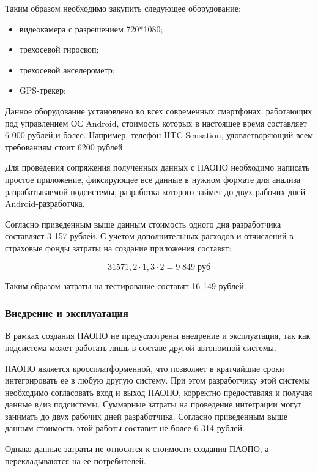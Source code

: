 Таким образом необходимо закупить следующее оборудование:
\begin{itemize}
\item видеокамера с разрешением 720*1080;
\item трехосевой гироскоп;
\item трехосевой акселерометр;
\item GPS-трекер;
\end{itemize}

Данное оборудование установлено во всех современных смартфонах, работающих под управлением ОС Android, стоимость которых в настоящее время составляет 6 000 рублей и более. Например, телефон HTC Sensation, удовлетворяющий всем требованиям стоит 6200 рублей. 

Для проведения сопряжения полученных данных с ПАОПО необходимо написать простое приложение, фиксирующее все данные в нужном формате для анализа разрабатываемой подсистемы, разработка которого займет до двух рабочих дней Android-разработчка. 

Согласно приведенным выше данным стоимость одного дня разработчика составляет 3 157 рублей. С учетом дополнительных расходов и отчислений в страховые фонды затраты на создание приложения составят:

$$31571,2 \cdot 1,3 \cdot 2=9 \; 849 \; руб$$

Таким образом затраты на тестирование составят 16 149 рублей.

\subsubsection{Внедрение и эксплуатация}

В рамках создания ПАОПО не предусмотрены внедрение и эксплуатация, так как подсистема может работать лишь в составе другой автономной системы. 

ПАОПО является кроссплатформенной, что позволяет в кратчайшие сроки интегрировать ее в любую другую систему. При этом разработчику этой системы необходимо согласовать вход и выход ПАОПО, корректно предоставляя и получая данные в/из подсистемы. Суммарные затраты на проведение интеграции могут занимать до двух рабочих дней разработчика. Согласно приведенным выше данным стоимость этой работы составит не более 6 314 рублей. 

Однако данные затраты не относятся к стоимости создания ПАОПО, а перекладываются на ее потребителей. 


